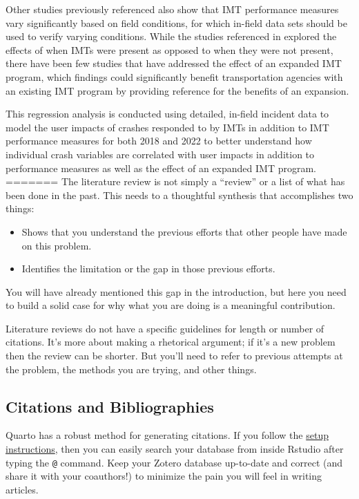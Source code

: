 \documentclass[
  letterpaper,
  authoryear]{elsarticle}
\providecommand{\tightlist}{%
  \setlength{\itemsep}{0pt}\setlength{\parskip}{0pt}}\usepackage{longtable,booktabs,array}
\begin{document}
Other studies previously referenced also show that IMT performance
measures vary significantly based on field conditions, for which
in-field data sets should be used to verify varying conditions. While
the studies referenced in \citet{shah_development_2022} explored the
effects of when IMTs were present as opposed to when they were not
present, there have been few studies that have addressed the effect of
an expanded IMT program, which findings could significantly benefit
transportation agencies with an existing IMT program by providing
reference for the benefits of an expansion.

This regression analysis is conducted using detailed, in-field incident
data to model the user impacts of crashes responded to by IMTs in
addition to IMT performance measures for both 2018 and 2022 to better
understand how individual crash variables are correlated with user
impacts in addition to performance measures as well as the effect of an
expanded IMT program.
=======
The literature review is not simply a ``review'' or a list of what has
been done in the past. This needs to a thoughtful synthesis that
accomplishes two things:

\begin{itemize}
\tightlist
\item
  Shows that you understand the previous efforts that other people have
  made on this problem.
\item
  Identifies the limitation or the gap in those previous efforts.
\end{itemize}

You will have already mentioned this gap in the introduction, but here
you need to build a solid case for why what you are doing is a
meaningful contribution.

Literature reviews do not have a specific guidelines for length or
number of citations. It's more about making a rhetorical argument; if
it's a new problem then the review can be shorter. But you'll need to
refer to previous attempts at the problem, the methods you are trying,
and other things.

\subsection{Citations and
Bibliographies}\label{citations-and-bibliographies}

Quarto has a robust method for generating citations. If you follow the
\href{https://quarto.org/docs/visual-editor/technical.html\#citations-from-zotero}{setup
instructions}, then you can easily search your database from inside
Rstudio after typing the \texttt{@} command. Keep your Zotero database
up-to-date and correct (and share it with your coauthors!) to minimize
the pain you will feel in writing articles.
\end{document}
